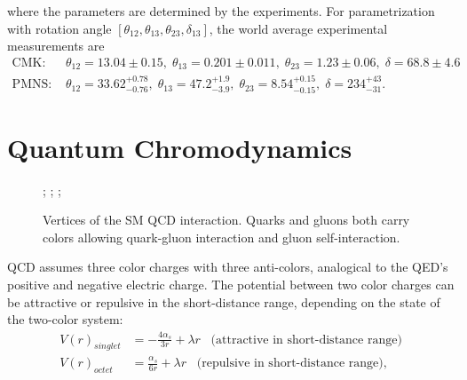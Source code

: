 \noindent where the parameters are determined by the experiments. For parametrization with rotation angle $[ \theta_{12},\theta_{13},\theta_{23},\delta_{13}] $, the world average experimental measurements are
\begin{align}
    \text{CMK: } & \theta_{12}=13.04\pm0.15, \; \theta_{13}=0.201\pm0.011, \; \theta_{23}=1.23\pm0.06, \; \delta = 68.8\pm 4.6  \\
    \text{PMNS: } &\theta_{12}=33.62 ^{+0.78}_{-0.76}, \;  \theta_{13}=47.2  ^{+1.9}_{-3.9}, \; \theta_{23}= 8.54 ^{+0.15}_{-0.15}, \;  \delta = 234 ^{+43}_{-31}.
\end{align}


\section{Quantum Chromodynamics}
\label{sec:relatedWorks:qft:qcd}



\begin{figure}[ht]
    \centering
    ; \qquad
    ; \qquad
    ;    
    \caption{Vertices of the SM QCD interaction. Quarks and gluons both carry colors allowing quark-gluon interaction and gluon self-interaction. }
    \label{fig:my_label}
\end{figure}

QCD assumes three color charges with three anti-colors, analogical to the QED's positive and negative electric charge. The potential between two color charges can be attractive or repulsive in the short-distance range, depending on the state of the two-color system:
\begin{align}
	 V(r)_{singlet} &= -\frac{4\alpha_s}{3r} + \lambda r \;\;\; \text{(attractive in short-distance range)}\\
    V(r)_{octet} &= \frac{\alpha_s}{6r} + \lambda r \;\;\; \text{(repulsive in short-distance range)}, 
\end{align}


